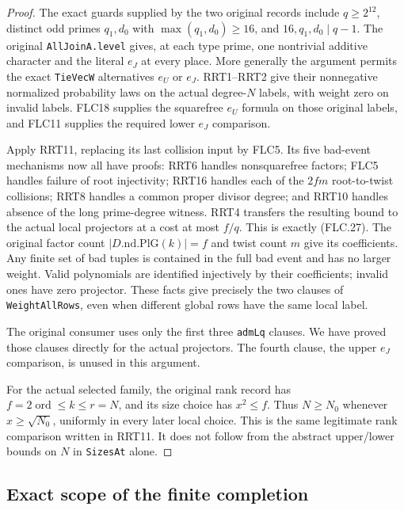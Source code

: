 \documentclass[11pt,a4paper]{article}
\numberwithin{equation}{section}
\theoremstyle{remark}\newtheorem{remark}[theorem]{Remark}
\begin{document}
\begin{proof}
The exact guards supplied by the two original records include
$q\ge2^{12}$, distinct odd primes $q_1,d_0$ with
$\max(q_1,d_0)\ge16$, and $16,q_1,d_0\mid q-1$.
The original \texttt{All\allowbreak Join\allowbreak A.\allowbreak level} gives, at each type
prime, one nontrivial additive character and the literal
$e_J$ at every place.  More generally the argument permits
the exact \texttt{Tie\allowbreak Vec\allowbreak W} alternatives $e_U$ or $e_J$.
RRT1--RRT2 give their nonnegative normalized probability
laws on the actual degree-$N$ labels, with weight zero on
invalid labels.  FLC18 supplies the squarefree $e_U$ formula
on those original labels, and FLC11 supplies the required
lower $e_J$ comparison.

Apply RRT11, replacing its last collision input by FLC5.
Its five bad-event mechanisms now all have proofs:
RRT6 handles nonsquarefree factors; FLC5 handles failure of
root injectivity; RRT16 handles each of the $2fm$ root-to-twist
collisions; RRT8 handles a common proper divisor degree;
and RRT10 handles absence of the long prime-degree witness.
RRT4 transfers the resulting bound to the actual local
projectors at a cost at most $f/q$.  This is exactly (FLC.27).
The original factor count $|D.\mathrm{nd}.\mathrm{PlG}(k)|=f$
and twist count $m$ give its coefficients.
Any finite set of bad tuples is contained in the full bad
event and has no larger weight.  Valid polynomials are
identified injectively by their coefficients; invalid ones
have zero projector.  These facts give precisely the two
clauses of \texttt{Weight\allowbreak All\allowbreak Rows}, even when different global
rows have the same local label.

The original consumer 
uses only the first three \texttt{adm\allowbreak Lq} clauses.
We have proved those clauses directly for the actual
projectors.  The fourth clause, the upper $e_J$ comparison,
is unused in this argument.

For the actual selected family, the original rank record
has $f=2\operatorname{ord}\le k\le r=N$, and its size
choice has $x^2\le f$.  Thus $N\ge N_0$ whenever
$x\ge\sqrt{N_0}$, uniformly in every later local choice.
This is the same legitimate rank comparison written in
RRT11.  It does not follow from the abstract upper/lower
bounds on $N$ in \texttt{Sizes\allowbreak At} alone.
\end{proof}

\subsection{Exact scope of the finite completion}
\end{document}
